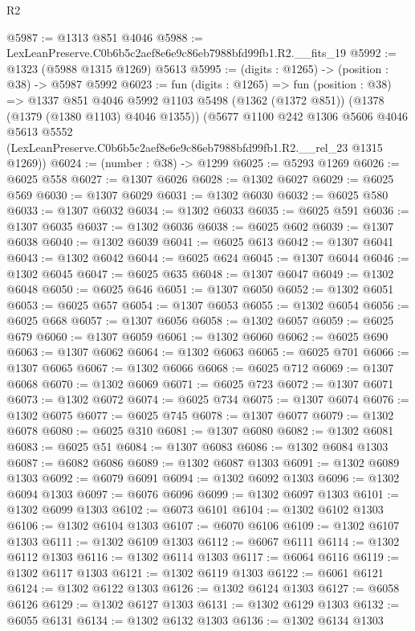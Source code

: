 \begin{lexlean}{R2}
\begin{coremodule}
@5987 := @1313 @851 @4046
@5988 := LexLeanPreserve.C0b6b5c2aef8e6e9c86eb7988bfd99fb1.R2.__fits_19
@5992 := @1323 (@5988 @1315 @1269) @5613
@5995 := (digits : @1265) -> (position : @38) -> @5987 @5992
@6023 := fun (digits : @1265) =>
  fun (position : @38) =>
  @1337
    @851
    @4046
    @5992
    @1103
    @5498
    (@1362 (@1372 @851))
    (@1378 (@1379 (@1380 @1103) @4046 @1355))
    (@5677
      @1100
      @242
      @1306
      @5606
      @4046
      @5613
      @5552
      (LexLeanPreserve.C0b6b5c2aef8e6e9c86eb7988bfd99fb1.R2.__rel_23 @1315 @1269))
@6024 := (number : @38) -> @1299
@6025 := @5293 @1269
@6026 := @6025 @558
@6027 := @1307 @6026
@6028 := @1302 @6027
@6029 := @6025 @569
@6030 := @1307 @6029
@6031 := @1302 @6030
@6032 := @6025 @580
@6033 := @1307 @6032
@6034 := @1302 @6033
@6035 := @6025 @591
@6036 := @1307 @6035
@6037 := @1302 @6036
@6038 := @6025 @602
@6039 := @1307 @6038
@6040 := @1302 @6039
@6041 := @6025 @613
@6042 := @1307 @6041
@6043 := @1302 @6042
@6044 := @6025 @624
@6045 := @1307 @6044
@6046 := @1302 @6045
@6047 := @6025 @635
@6048 := @1307 @6047
@6049 := @1302 @6048
@6050 := @6025 @646
@6051 := @1307 @6050
@6052 := @1302 @6051
@6053 := @6025 @657
@6054 := @1307 @6053
@6055 := @1302 @6054
@6056 := @6025 @668
@6057 := @1307 @6056
@6058 := @1302 @6057
@6059 := @6025 @679
@6060 := @1307 @6059
@6061 := @1302 @6060
@6062 := @6025 @690
@6063 := @1307 @6062
@6064 := @1302 @6063
@6065 := @6025 @701
@6066 := @1307 @6065
@6067 := @1302 @6066
@6068 := @6025 @712
@6069 := @1307 @6068
@6070 := @1302 @6069
@6071 := @6025 @723
@6072 := @1307 @6071
@6073 := @1302 @6072
@6074 := @6025 @734
@6075 := @1307 @6074
@6076 := @1302 @6075
@6077 := @6025 @745
@6078 := @1307 @6077
@6079 := @1302 @6078
@6080 := @6025 @310
@6081 := @1307 @6080
@6082 := @1302 @6081
@6083 := @6025 @51
@6084 := @1307 @6083
@6086 := @1302 @6084 @1303
@6087 := @6082 @6086
@6089 := @1302 @6087 @1303
@6091 := @1302 @6089 @1303
@6092 := @6079 @6091
@6094 := @1302 @6092 @1303
@6096 := @1302 @6094 @1303
@6097 := @6076 @6096
@6099 := @1302 @6097 @1303
@6101 := @1302 @6099 @1303
@6102 := @6073 @6101
@6104 := @1302 @6102 @1303
@6106 := @1302 @6104 @1303
@6107 := @6070 @6106
@6109 := @1302 @6107 @1303
@6111 := @1302 @6109 @1303
@6112 := @6067 @6111
@6114 := @1302 @6112 @1303
@6116 := @1302 @6114 @1303
@6117 := @6064 @6116
@6119 := @1302 @6117 @1303
@6121 := @1302 @6119 @1303
@6122 := @6061 @6121
@6124 := @1302 @6122 @1303
@6126 := @1302 @6124 @1303
@6127 := @6058 @6126
@6129 := @1302 @6127 @1303
@6131 := @1302 @6129 @1303
@6132 := @6055 @6131
@6134 := @1302 @6132 @1303
@6136 := @1302 @6134 @1303

\end{coremodule}
\end{lexlean}
